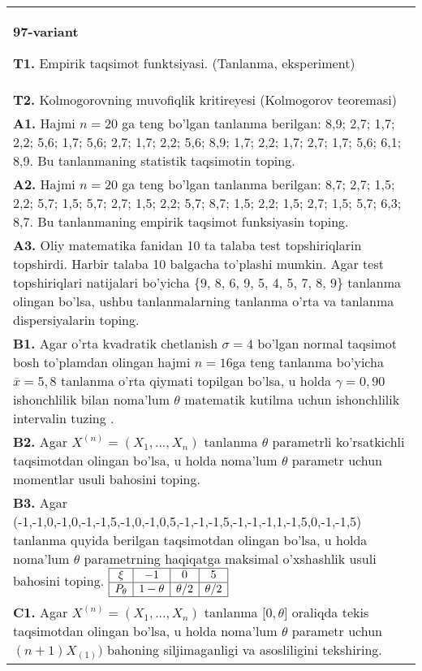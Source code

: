\documentclass{article}
\begin{document}
\begin{tabular}{m{17cm}}
\textbf{97-variant}
\newline

\textbf{T1.} 
Empirik taqsimot funktsiyasi. (Tanlanma, eksperiment)
\\
\textbf{T2.} 
Kolmogorovning muvofiqlik kritireyesi (Kolmogorov teoremasi)
\\
\textbf{A1.} 
Hajmi \(n = 20\) ga teng bo'lgan tanlanma berilgan: 8,9; 2,7; 1,7; 2,2; 5,6; 1,7; 5,6; 2,7; 1,7; 2,2; 5,6; 8,9; 1,7; 2,2; 1,7; 2,7; 1,7; 5,6; 6,1; 8,9. Bu tanlanmaning statistik taqsimotin toping.
\\
\textbf{A2.} 
Hajmi \(n = 20\) ga teng bo'lgan tanlanma berilgan: 8,7; 2,7; 1,5; 2,2; 5,7; 1,5; 5,7; 2,7; 1,5; 2,2; 5,7; 8,7; 1,5; 2,2; 1,5; 2,7; 1,5; 5,7; 6,3; 8,7. Bu tanlanmaning empirik taqsimot funksiyasin toping.
\\
\textbf{A3.} 
Oliy matematika fanidan 10 ta talaba test topshiriqlarin topshirdi. Harbir talaba 10 balgacha to'plashi mumkin. Agar test topshiriqlari natijalari bo'yicha \{9, 8, 6, 9, 5, 4, 5, 7, 8, 9\} tanlanma olingan bo'lsa, ushbu tanlanmalarning tanlanma o'rta va tanlanma dispersiyalarin toping.
\\
\textbf{B1.} 
Agar o'rta kvadratik chetlanish \(\sigma = 4\) bo'lgan normal taqsimot bosh to'plamdan olingan hajmi \(n = 16\)ga teng tanlanma bo'yicha \(\overline{x} = 5,8\) tanlanma o'rta qiymati topilgan bo'lsa, u holda \(\gamma = 0,90\) ishonchlilik bilan noma'lum \(\theta\) matematik kutilma uchun ishonchlilik intervalin tuzing .
\\
\textbf{B2.} 
Agar \(X^{(n)} = \left( X_{1},...,X_{n} \right)\) tanlanma \(\theta\) parametrli ko'rsatkichli taqsimotdan olingan bo'lsa, u holda noma'lum \(\theta\) parametr uchun momentlar usuli bahosini toping.
\\
\textbf{B3.} 
Agar (-1,-1,0,-1,0,-1,-1,5,-1,0,-1,0,5,-1,-1,-1,5,-1,-1,-1,1,-1,5,0,-1,-1,5) tanlanma quyida berilgan taqsimotdan olingan bo'lsa, u holda noma'lum \(\theta\) parametrning haqiqatga maksimal o'xshashlik usuli bahosini toping.
$\begin{array}{|c|c|c|c|}
    \hline
    \xi & - 1 & 0 & 5\\
    \hline
    P_{\theta} & 1 - \theta & \theta/2 & \theta/2 \\
    \hline
\end{array}$
\\
\textbf{C1.} 
Agar \(X^{(n)} = \left( X_{1},...,X_{n} \right)\) tanlanma \(\lbrack 0,\theta\rbrack\) oraliqda tekis taqsimotdan olingan bo'lsa, u holda noma'lum \(\theta\) parametr uchun \((n + 1)X_{(1)})\) bahoning siljimaganligi va asosliligini tekshiring.

\end{tabular}
\end{document}
